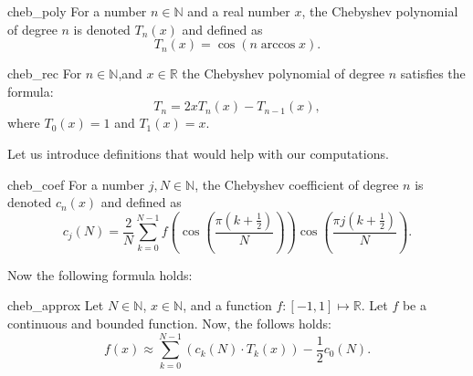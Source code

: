 \documentclass[12pt]{article}
\begin{document}
\begin{DefinitionColor}{\cite[p~.233]{press2007numerical}}{cheb_poly}
    For a number $n\in \mathbb{N}$ and a real number $x$, the Chebyshev polynomial of degree $n$ is denoted $T_n(x)$ and defined as
    \begin{equation*}
        T_n(x) = \cos(n \arccos x).
    \end{equation*}
\end{DefinitionColor}

\begin{TheoremColor}{}{cheb_rec}
    For $n \in \mathbb{N}$,and $x \in \mathbb{R}$ the Chebyshev polynomial of degree $n$ satisfies the formula:
    \begin{equation*}
        T_n=2xT_n(x) - T_{n-1}(x),
    \end{equation*}
    where $T_0(x) =1$ and $T_1(x) = x$.
\end{TheoremColor}
Let us introduce definitions that would help with our computations.

\begin{DefinitionColor}{\cite[p~.234]{press2007numerical}}{cheb_coef}
    For a number $j, N\in \mathbb{N}$, the Chebyshev coefficient of degree $n$ is denoted $c_n(x)$ and defined as
    \begin{equation*}
        c_j(N) = \frac{2}{N} \sum_{k=0}^{N-1} f\left( \cos\left(  \frac{\pi(k+\frac{1}{2})}{N}\right)  \right) \cos \left(\frac{\pi j(k+\frac{1}{2})}{N}\right).
    \end{equation*}
\end{DefinitionColor}

Now the following formula holds:
\begin{TheoremColor}{}{cheb_approx}
    Let $N \in \mathbb{N}$, $x \in \mathbb{N}$, and a function $f : [-1, 1] \mapsto \mathbb{R}$.
    Let $f$ be a continuous and bounded function. Now, the follows holds:
    \begin{equation*}
        f(x) \approx \sum_{k=0}^{N-1} \left(c_k(N) \cdot T_k(x)\right) - \frac{1}{2} c_0(N).
    \end{equation*}
\end{TheoremColor}
\end{document}
